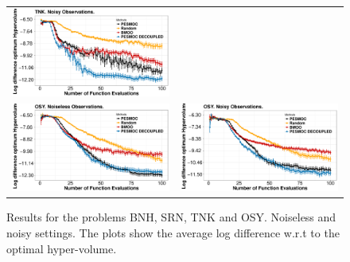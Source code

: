 \begin{figure}[H]
\begin{tabular}{cc}
                \includegraphics[width=0.475\linewidth]{Figures/benchmark/TNK_noisy.pdf} \\
                \includegraphics[width=0.475\linewidth]{Figures/benchmark/OSY.pdf} &
                \includegraphics[width=0.475\linewidth]{Figures/benchmark/OSY_noisy.pdf} \\
        \end{tabular}
        \caption{Results for the problems BNH, SRN, TNK and OSY. Noiseless and noisy settings. The plots show
                the average log difference w.r.t to the optimal hyper-volume.}
        \label{fig:benchmark_results_1}
\end{figure}

